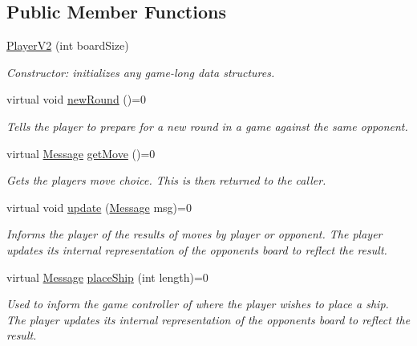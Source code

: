 \subsection*{Public Member Functions}
\begin{DoxyCompactItemize}
\item 
\hyperlink{classPlayerV2_a22416fa1e23e66616a9ef488872340d2}{Player\+V2} (int board\+Size)
\begin{DoxyCompactList}\small\item\em Constructor\+: initializes any game-\/long data structures. \end{DoxyCompactList}\item 
virtual void \hyperlink{classPlayerV2_afb845a64b9ee9840b1512b1ccd69489a}{new\+Round} ()=0
\begin{DoxyCompactList}\small\item\em Tells the player to prepare for a new round in a game against the same opponent. \end{DoxyCompactList}\item 
virtual \hyperlink{classMessage}{Message} \hyperlink{classPlayerV2_a8ef82d33acbfd417bb065bb7e01961cc}{get\+Move} ()=0
\begin{DoxyCompactList}\small\item\em Gets the player\textquotesingle{}s move choice. This is then returned to the caller. \end{DoxyCompactList}\item 
virtual void \hyperlink{classPlayerV2_a8d87312a1ce2756e25bb6e6438e8673c}{update} (\hyperlink{classMessage}{Message} msg)=0
\begin{DoxyCompactList}\small\item\em Informs the player of the results of move\textquotesingle{}s by player or opponent. The player updates its internal representation of the opponent\textquotesingle{}s board to reflect the result. \end{DoxyCompactList}\item 
virtual \hyperlink{classMessage}{Message} \hyperlink{classPlayerV2_aebf171921d494578b592422210621a9a}{place\+Ship} (int length)=0
\begin{DoxyCompactList}\small\item\em Used to inform the game controller of where the player wishes to place a ship. The player updates its internal representation of the opponent\textquotesingle{}s board to reflect the result. \end{DoxyCompactList}\end{DoxyCompactItemize}
